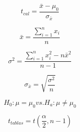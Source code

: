 $$t_{cal} = \frac{\bar{x} - \mu_{0}}{\sigma_{\bar{x}}}$$
   
$$\bar{x} = \frac{\sum_{i=1}^{\mathit{n}} \mathit{x}_{i}}{\mathit{n}}$$

$$\sigma^{2} = \frac{\sum_{i=1}^{\mathit{n}} x_{i}^{2} - \mathit{n}\bar{x}^{2}}{\mathit{n} - 1}$$

$$\sigma_{\bar{x}} = \sqrt{\frac{\sigma^{2}}{n}}$$

$$H_{0}: \mu = \mu_{0} \mathit{ vs. } H_{a}: \mu \not= \mu_{0}$$

$$t_{tablas} = t(\frac{\alpha}{2}, n-1)$$